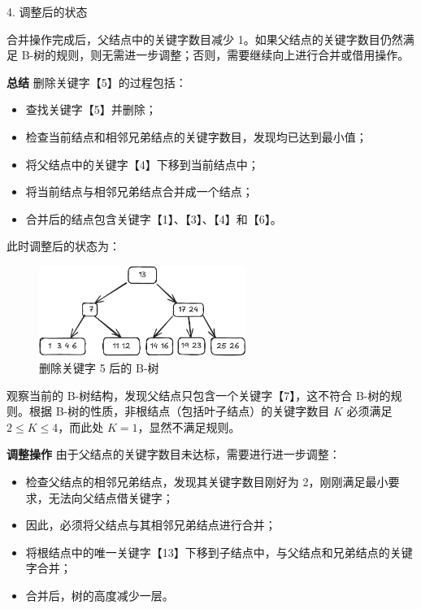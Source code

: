 \documentclass[lang=cn,newtx,10pt,scheme=chinese]{../elegantbook}
\begin{document}
      4. 调整后的状态 

         合并操作完成后，父结点中的关键字数目减少 1。如果父结点的关键字数目仍然满足 B-树的规则，则无需进一步调整；否则，需要继续向上进行合并或借用操作。
      
      
      \textbf{总结}  
      删除关键字【5】的过程包括：
      \begin{itemize}
        \item 查找关键字【5】并删除；
        \item 检查当前结点和相邻兄弟结点的关键字数目，发现均已达到最小值；
        \item 将父结点中的关键字【4】下移到当前结点中；
        \item 将当前结点与相邻兄弟结点合并成一个结点；
        \item 合并后的结点包含关键字【1】、【3】、【4】和【6】。
      \end{itemize}

      此时调整后的状态为：
      \begin{figure}[!htbp]
          \centering
          \includegraphics[width=0.6\textwidth]{./figure/pdf/cropped/Btree_del5.pdf}
          \caption{删除关键字 5 后的 B-树}
          \label{fig:Btree_delete_5}

      \end{figure}

观察当前的 B-树结构，发现父结点只包含一个关键字【7】，这不符合 B-树的规则。根据 B-树的性质，非根结点（包括叶子结点）的关键字数目 $K$ 必须满足 $2 \leq K \leq 4$，而此处 $K = 1$，显然不满足规则。


\textbf{调整操作}  
由于父结点的关键字数目未达标，需要进行进一步调整：
\begin{itemize}
  \item 检查父结点的相邻兄弟结点，发现其关键字数目刚好为 2，刚刚满足最小要求，无法向父结点借关键字；
  \item 因此，必须将父结点与其相邻兄弟结点进行合并；
  \item 将根结点中的唯一关键字【13】下移到子结点中，与父结点和兄弟结点的关键字合并；
  \item 合并后，树的高度减少一层。
\end{itemize}
\end{document}
